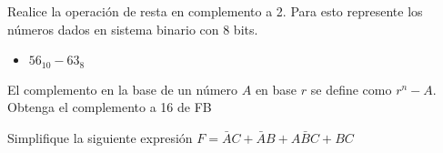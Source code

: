 \documentclass[addpoints]{exam}
\begin{document}
\begin{questions}
  

\question[1] Realice la operación de resta en complemento a 2. Para esto
represente los números dados en sistema binario con 8 bits.

\begin{itemize}

  
\item $56_{10}-63_{8}$

\end{itemize}



\question[\half] El complemento en la base de un número $A$ en base $r$ se
define como $r^n-A$. Obtenga el complemento a 16 de FB


\question Simplifique la siguiente expresión
$F=\bar{A}C+\bar{A}B+A\bar{B}C+BC$
\droptotalpoints


\end{questions}
\end{document}
